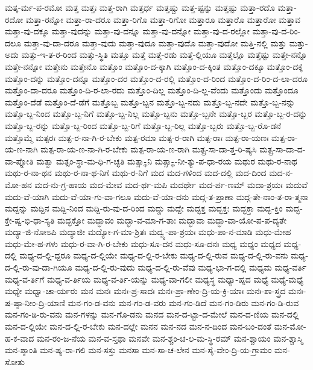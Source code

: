 {ಮತ್ಕ-ರ್ಮ-ಪ-ರಮೋ
ಮತ್ತ
ಮತ್ತಃ
ಮತ್ತ-ರಾಗಿ
ಮತ್ತರ್ಧ
ಮತ್ತಷ್ಚು
ಮತ್ತ-ಷ್ಟನ್ನು
ಮತ್ತಷ್ಟು
ಮತ್ತಾ-ರದೊ
ಮತ್ತಾ-ರದೋ
ಮತ್ತಾ-ರನ್ನೋ
ಮತ್ತಾ-ರಾ-ದರೂ
ಮತ್ತಾ-ರಿಗೊ
ಮತ್ತಾ-ರಿಗೋ
ಮತ್ತಾರೂ
ಮತ್ತಾರೊ
ಮತ್ತಾರೋ
ಮತ್ತಾವ
ಮತ್ತಾ-ವು-ದಕ್ಕೂ
ಮತ್ತಾ-ವುದನ್ನು
ಮತ್ತಾ-ವು-ದನ್ನೂ
ಮತ್ತಾ-ವು-ದನ್ನೋ
ಮತ್ತಾ-ವು-ದ-ರಲ್ಲೋ
ಮತ್ತಾ-ವು-ದ-ರಿಂ-ದಲೂ
ಮತ್ತಾ-ವು-ದಾ-ದರೂ
ಮತ್ತಾ-ವುದು
ಮತ್ತಾ-ವುದೂ
ಮತ್ತಾ-ವುದೊ
ಮತ್ತಾ-ವುದೋ
ಮತ್ತಿ-ನಲ್ಲಿ
ಮತ್ತು
ಮತ್ತು-ಅದು
ಮತ್ತು-ಇ-ತ-ರ-ರಿಂದ
ಮತ್ತು-ಸ್ಥಿತಿ
ಮತ್ತೂ
ಮತ್ತೆ
ಮತ್ತೆ-ರಡು
ಮತ್ತೆ-ಲ್ಲಿಯೂ
ಮತ್ತೆಲ್ಲೊ
ಮತ್ತೆಷ್ಟು
ಮತ್ತೇ-ನನ್ನೊ
ಮತ್ತೇ-ನನ್ನೋ
ಮತ್ತೇನು
ಮತ್ತೇನೊ
ಮತ್ತೊಂ
ಮತ್ತೊಂ-ದ-ಕ್ಕಾಗಿ
ಮತ್ತೊಂ-ದ-ಕ್ಕಿಂತ
ಮತ್ತೊಂ-ದಕ್ಕೂ
ಮತ್ತೊಂ-ದಕ್ಕೆ
ಮತ್ತೊಂ-ದನ್ನು
ಮತ್ತೊಂ-ದನ್ನೂ
ಮತ್ತೊಂ-ದರ
ಮತ್ತೊಂ-ದ-ರಲ್ಲಿ
ಮತ್ತೊಂ-ದ-ರಿಂದ
ಮತ್ತೊಂ-ದ-ರಿಂ-ದ-ಲಾ-ದರೂ
ಮತ್ತೊಂ-ದಾ-ದರೂ
ಮತ್ತೊಂ-ದಿ-ರ-ಲಾ-ರದು
ಮತ್ತೊಂ-ದಿಲ್ಲ
ಮತ್ತೊಂ-ದಿ-ಲ್ಲ-ವೆಂದು
ಮತ್ತೊಂದು
ಮತ್ತೊಂದೂ
ಮತ್ತೊಂ-ದೆಡೆ
ಮತ್ತೊಂ-ದೆ-ಡೆಗೆ
ಮತ್ತೊಬ್ಬ
ಮತ್ತೊ-ಬ್ಬನ
ಮತ್ತೊ-ಬ್ಬ-ನದು
ಮತ್ತೊ-ಬ್ಬ-ನದೇ
ಮತ್ತೊ-ಬ್ಬ-ನನ್ನು
ಮತ್ತೊ-ಬ್ಬ-ನಿಂದ
ಮತ್ತೊ-ಬ್ಬ-ನಿಗೆ
ಮತ್ತೊ-ಬ್ಬ-ನಿಲ್ಲ
ಮತ್ತೊ-ಬ್ಬನು
ಮತ್ತೊ-ಬ್ಬನೇ
ಮತ್ತೊ-ಬ್ಬರ
ಮತ್ತೊ-ಬ್ಬ-ರ-ದನ್ನು
ಮತ್ತೊ-ಬ್ಬ-ರನ್ನು
ಮತ್ತೊ-ಬ್ಬ-ರಿಂದ
ಮತ್ತೊ-ಬ್ಬ-ರಿಗೆ
ಮತ್ತೊ-ಬ್ಬ-ರಿಲ್ಲ
ಮತ್ತೊ-ಬ್ಬರು
ಮತ್ತೊ-ಬ್ಬ-ರೊ-ಡನೆ
ಮತ್ತೊಮ್ಮೆ
ಮತ್ಪರಃ
ಮತ್ಪ-ರ-ನಾ-ಗಿ-ರ-ಬೇಕು
ಮತ್ಪ-ರಮಾ
ಮತ್ಪ-ರ-ರಾಗಿ
ಮತ್ಪ-ರಾಃ
ಮತ್ಪ-ರಾ-ಯಣಃ
ಮತ್ಪ-ರಾ-ಯ-ಣ-ನಾಗಿ
ಮತ್ಪ-ರಾ-ಯ-ಣ-ನಾ-ಗಿ-ರ-ಬೇಕು
ಮತ್ಪ-ರಾ-ಯ-ಣ-ರಾಗಿ
ಮತ್ಪ್ರ-ಸಾ-ದಾ-ತ್ತ-ರಿ-ಷ್ಯಸಿ
ಮತ್ಪ್ರ-ಸಾ-ದಾ-ದ-ವಾ-ಪ್ನೋತಿ
ಮತ್ವಾ
ಮತ್ಸಂ-ಸ್ಥಾ-ಮ-ಧಿ-ಗ-ಚ್ಛತಿ
ಮತ್ಸಾ-್ಥನಿ
ಮತ್ಸಾ-್ಥ-ನೀ-ತ್ಯು-ಪ-ಧಾ-ರಯ
ಮಥುರ
ಮಥು-ರ-ನಾಥ
ಮಥು-ರ-ನಾ-ಥನ
ಮಥು-ರ-ನಾ-ಥ-ನಿಗೆ
ಮಥು-ರ-ನಿಗೆ
ಮದ
ಮದ-ಗಳಿಂದ
ಮದ-ದಲ್ಲಿ
ಮದ-ದಿಂದ
ಮದ-ನ-ಮೋ-ಹನ
ಮದ-ನು-ಗ್ರ-ಹಾಯ
ಮದ-ಮೇವ
ಮದ-ರ್ಥ-ಮಪಿ
ಮದರ್ಥೇ
ಮದ-ರ್ಪ-ಣಮ್
ಮದಾ-ಶ್ರಯಃ
ಮದುವೆ
ಮದು-ವೆ-ಯಾಗಿ
ಮದು-ವೆ-ಯಾ-ಗು-ವಾ-ಗಲೂ
ಮದು-ವೆ-ಯಾ-ದನು
ಮದ್ಗ-ತ-ಪ್ರಾಣಾ
ಮದ್ಗ-ತೇ-ನಾಂ-ತ-ರಾ-ತ್ಮನಾ
ಮದ್ದನ್ನು
ಮದ್ದಿನ
ಮದ್ದಿ-ನಿಂದ
ಮದ್ದಿ-ರು-ವು-ದ-ರಿಂದ
ಮದ್ದು
ಮದ್ದೇ
ಮದ್ಭಕ್ತ
ಮದ್ಭಕ್ತಃ
ಮದ್ಭಕ್ತಾ
ಮದ್ಭ-ಕ್ತಿಂ
ಮದ್ಭ-ಕ್ತೇ-ಷ್ವ-ಭಿ-ಧಾ-ಸ್ಯತಿ
ಮದ್ಭಕ್ತೋ
ಮದ್ಭಾವಂ
ಮದ್ಭಾ-ವ-ಮಾ-ಗ-ತಾಃ
ಮದ್ಭಾವಾ
ಮದ್ಭಾ-ವಾ-ಯೋ-ಪ-ಪ-ದ್ಯತೇ
ಮದ್ಯಾ-ಜಿ-ನೋಽಪಿ
ಮದ್ಯಾಜೀ
ಮದ್ಯೋ-ಗ-ಮಾ-ಶ್ರಿತಃ
ಮದ್ವ್ಯ-ಪಾ-ಶ್ರಯಃ
ಮಧು-ಪಾ-ನ-ಮಾಡಿ
ಮಧು-ಮೇಹ
ಮಧು-ಮೇ-ಹ-ಗಳು
ಮಧು-ರ-ವಾ-ಗಿ-ರ-ಬೇಕು
ಮಧು-ಸೂ-ದನ
ಮಧು-ಸೂ-ದನಃ
ಮಧ್ಯ
ಮಧ್ಯಂ
ಮಧ್ಯದ
ಮಧ್ಯ-ದಲ್ಲಿ
ಮಧ್ಯ-ದ-ಲ್ಲಿ-ದ್ದರೂ
ಮಧ್ಯ-ದ-ಲ್ಲಿಯೇ
ಮಧ್ಯ-ದ-ಲ್ಲಿ-ರ-ಬೇಕು
ಮಧ್ಯ-ದ-ಲ್ಲಿ-ರುವ
ಮಧ್ಯ-ದ-ಲ್ಲಿ-ರು-ವನು
ಮಧ್ಯ-ದ-ಲ್ಲಿ-ರು-ವು-ದಾ-ಗಿಯೂ
ಮಧ್ಯ-ದ-ಲ್ಲಿ-ರು-ವುದು
ಮಧ್ಯ-ದ-ಲ್ಲಿ-ರು-ವೆವು
ಮಧ್ಯ-ಭಾ-ಗ-ದಲ್ಲಿ
ಮಧ್ಯಮ
ಮಧ್ಯ-ವರ್ತಿ
ಮಧ್ಯ-ವ-ರ್ತಿಗೆ
ಮಧ್ಯ-ವ-ರ್ತಿಯ
ಮಧ್ಯ-ವ-ರ್ತಿ-ಯನ್ನು
ಮಧ್ಯ-ವಾ-ಗಲೀ
ಮಧ್ಯಸ್ಥ
ಮಧ್ಯಾ-ಹ್ನದ
ಮಧ್ಯೆ
ಮಧ್ಯೆ-ಮಧ್ಯೆ
ಮಧ್ಯೇ
ಮಧ್ವಾ-ಚಾ-ರ್ಯರು
ಮನ
ಮನಃ
ಮನಃ-ಪ್ರ-ಸಾದಃ
ಮನಃ-ಪ್ರಾ-ಣೇಂ-ದ್ರಿ-ಯ-ಕ್ರಿ-ಯಾಃ
ಮನಃ-ಶಾ-ಸ್ತ್ರದ
ಮನಃ-ಷ-ಷ್ಠಾ-ನೀಂ-ದ್ರಿ-ಯಾಣಿ
ಮನ-ಗಂ-ಡ-ವನು
ಮನ-ಗಂ-ಡ-ವರು
ಮನ-ಗಂ-ಡಿದೆ
ಮನ-ಗಂ-ಡಿರು
ಮನ-ಗಂ-ಡಿ-ರುವ
ಮನ-ಗಂ-ಡಿ-ರು-ವನು
ಮನ-ಗಳನ್ನು
ಮನ-ಗೊ-ಡನು
ಮನದ
ಮನ-ದ-ಟ್ಟಾ-ದ-ಮೇಲೆ
ಮನ-ದ-ಣಿಯ
ಮನ-ದಲ್ಲಿ
ಮನ-ದ-ಲ್ಲಿಯೇ
ಮನ-ದ-ಲ್ಲಿ-ರ-ಬೇಕು
ಮನ-ದಲ್ಲೇ
ಮನನ
ಮನ-ನದ
ಮನ-ನ-ದಿಂದ
ಮನ-ಬಂ-ದಂತೆ
ಮನ-ಮೋ-ಹ-ಕ-ವಾದ
ಮನ-ರಂ-ಜ-ನೆಯ
ಮನ-ವ-ಸ್ತಥಾ
ಮನವೇ
ಮನ-ಶ್ಚಂ-ಚ-ಲ-ಮ-ಸ್ಥಿ-ರಮ್
ಮನ-ಶ್ಚಾಯಂ
ಮನ-ಶ್ಚಾಸ್ಮಿ
ಮನ-ಶ್ಶಾಂತಿ
ಮನ-ಷ್ಯ-ರಾ-ಗಲಿ
ಮನ-ಸಸ್ತು
ಮನಸಾ
ಮನ-ಸಾ-ಚ-ಲೇನ
ಮನ-ಸೈ-ವೇಂ-ದ್ರಿ-ಯ-ಗ್ರಾಮಂ
ಮನ-ಸೋತು
}
